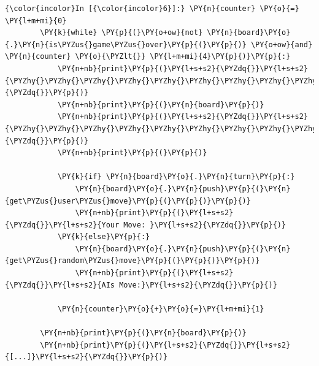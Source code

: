    \begin{Verbatim}[commandchars=\\\{\}]
{\color{incolor}In [{\color{incolor}6}]:} \PY{n}{counter} \PY{o}{=} \PY{l+m+mi}{0}
        \PY{k}{while} \PY{p}{(}\PY{o+ow}{not} \PY{n}{board}\PY{o}{.}\PY{n}{is\PYZus{}game\PYZus{}over}\PY{p}{(}\PY{p}{)} \PY{o+ow}{and} \PY{n}{counter} \PY{o}{\PYZlt{}} \PY{l+m+mi}{4}\PY{p}{)}\PY{p}{:}
            \PY{n+nb}{print}\PY{p}{(}\PY{l+s+s2}{\PYZdq{}}\PY{l+s+s2}{\PYZhy{}\PYZhy{}\PYZhy{}\PYZhy{}\PYZhy{}\PYZhy{}\PYZhy{}\PYZhy{}\PYZhy{}\PYZhy{}\PYZhy{}\PYZhy{}\PYZhy{}\PYZhy{}\PYZhy{}}\PY{l+s+s2}{\PYZdq{}}\PY{p}{)}
            \PY{n+nb}{print}\PY{p}{(}\PY{n}{board}\PY{p}{)}
            \PY{n+nb}{print}\PY{p}{(}\PY{l+s+s2}{\PYZdq{}}\PY{l+s+s2}{\PYZhy{}\PYZhy{}\PYZhy{}\PYZhy{}\PYZhy{}\PYZhy{}\PYZhy{}\PYZhy{}\PYZhy{}\PYZhy{}\PYZhy{}\PYZhy{}\PYZhy{}\PYZhy{}\PYZhy{}}\PY{l+s+s2}{\PYZdq{}}\PY{p}{)}
            \PY{n+nb}{print}\PY{p}{(}\PY{p}{)}
            
            \PY{k}{if} \PY{n}{board}\PY{o}{.}\PY{n}{turn}\PY{p}{:}
                \PY{n}{board}\PY{o}{.}\PY{n}{push}\PY{p}{(}\PY{n}{get\PYZus{}user\PYZus{}move}\PY{p}{(}\PY{p}{)}\PY{p}{)}
                \PY{n+nb}{print}\PY{p}{(}\PY{l+s+s2}{\PYZdq{}}\PY{l+s+s2}{Your Move: }\PY{l+s+s2}{\PYZdq{}}\PY{p}{)}
            \PY{k}{else}\PY{p}{:}
                \PY{n}{board}\PY{o}{.}\PY{n}{push}\PY{p}{(}\PY{n}{get\PYZus{}random\PYZus{}move}\PY{p}{(}\PY{p}{)}\PY{p}{)}
                \PY{n+nb}{print}\PY{p}{(}\PY{l+s+s2}{\PYZdq{}}\PY{l+s+s2}{AIs Move:}\PY{l+s+s2}{\PYZdq{}}\PY{p}{)}
                
            \PY{n}{counter}\PY{o}{+}\PY{o}{=}\PY{l+m+mi}{1}
            
        \PY{n+nb}{print}\PY{p}{(}\PY{n}{board}\PY{p}{)}
        \PY{n+nb}{print}\PY{p}{(}\PY{l+s+s2}{\PYZdq{}}\PY{l+s+s2}{[...]}\PY{l+s+s2}{\PYZdq{}}\PY{p}{)}
\end{Verbatim}


